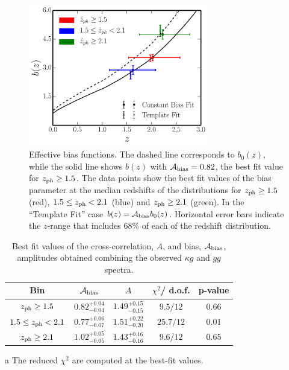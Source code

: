 \begin{figure} %
\centering %
\includegraphics[width=0.7\textwidth]{Chapter4/Images/bias_z_comp}
\caption{Effective bias functions. The dashed line corresponds to $b_0(z)$, while the solid line shows $b(z)$ with $\mathcal{A}_{\rm{bias}}=0.82$, the best fit value for $z_{\rm{ph}} \ge 1.5$. The data points show the best fit values of the bias parameter at the median redshifts of the distributions for $z_{\rm{ph}} \ge 1.5$ (red), $1.5 \le z_{\rm{ph}} < 2.1$ (blue) and $z_{\rm{ph}}\ge 2.1$ (green). In the ``Template Fit'' case $b(z) = \mathcal{A}_{\rm{bias}}b_0(z)$. Horizontal error bars indicate the $z$-range that includes 68\% of each of the redshift distribution.  \label{fig:b_z_comp}}
\end{figure}
%
\begin{table}[t]
\centering
\begin{threeparttable}
\begin{tabular}{ccccc}
\toprule
\midrule
Bin & $\mathcal{A}_{\rm{bias}}$ & $A$ & $\chi^2$/ d.o.f. & p-value\\
\midrule
$z_{\rm{ph}} \ge 1.5$  & $0.82^{+0.04}_{-0.04}$  &  $1.49^{+0.15}_{-0.15}$ & $9.5/12$ & $0.66$ \\
$1.5 \le z_{\rm{ph}} < 2.1$  & $0.77^{+0.06}_{-0.07}$   &  $1.51^{+0.22}_{-0.20}$  & $25.7/12$ & $0.01$ \\
$z_{\rm{ph}} \ge 2.1$  & $1.02^{+0.05}_{-0.05}$   &  $1.43^{+0.16}_{-0.16}$ & $9.6/12$ & $0.65$ \\
\bottomrule
\end{tabular}
\begin{tablenotes}
\item[a]The reduced $\chi^2$ are computed at the best-fit values.
\end{tablenotes}
\end{threeparttable}
\caption{Best fit values of the cross-correlation, $A$, and bias, $\mathcal{A}_{\rm{bias}}$, amplitudes obtained combining the observed $\kappa g$ and $gg$ spectra.\label{A_bias_A_results}}
\end{table}
%

